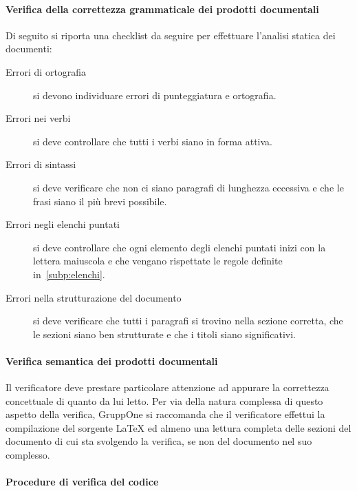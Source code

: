 \documentclass[../../norme-di-progetto.tex]{subfiles}
\begin{document}
\paragraph{Verifica della correttezza grammaticale dei prodotti documentali}%
\label{par:verifica_grammaticale_dei_prodotti_documentali}

Di seguito si riporta una checklist da seguire per effettuare l'analisi statica dei documenti:

\begin{description}
  \item [Errori di ortografia] si devono individuare errori di punteggiatura e ortografia.
  \item [Errori nei verbi] si deve controllare che tutti i verbi siano in forma attiva.
  \item [Errori di sintassi] si deve verificare che non ci siano paragrafi di lunghezza eccessiva e che le frasi siano il più brevi possibile.
  \item [Errori negli elenchi puntati] si deve controllare che ogni elemento degli elenchi puntati inizi con la lettera maiuscola e che vengano rispettate le regole definite in~\ref{subp:elenchi}.
  \item [Errori nella strutturazione del documento] si deve verificare che tutti i paragrafi si trovino nella sezione corretta, che le sezioni siano ben strutturate e che i titoli siano significativi.
\end{description}


\paragraph{Verifica semantica dei prodotti documentali}%
\label{par:verifica_semantica_dei_prodotti_documentali}

Il verificatore deve prestare particolare attenzione ad appurare la correttezza concettuale di quanto da lui letto. Per via della natura complessa di questo aspetto della verifica, GruppOne si raccomanda che il verificatore effettui la compilazione del sorgente \LaTeX{} ed almeno una lettura completa delle sezioni del documento di cui sta svolgendo la verifica, se non del documento nel suo complesso.


\paragraph{Procedure di verifica del codice}%
\label{par:procedure_di_verifica_del_codice}
\end{document}
